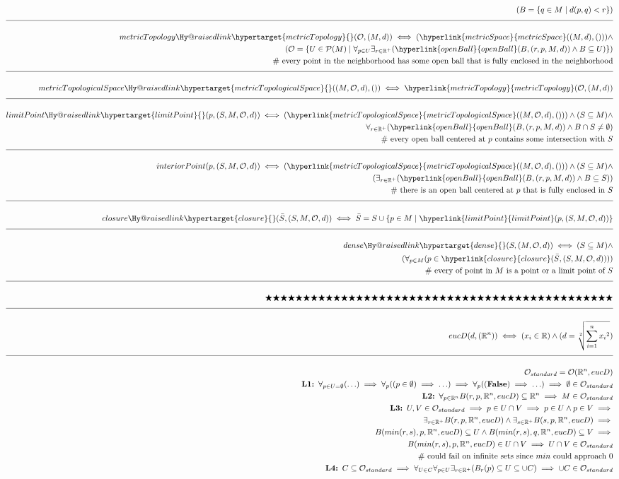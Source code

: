 \documentclass[a4paper]{article}
\makeatletter
\newcommand{\melazy}{\bigstar\bigstar\bigstar\bigstar\bigstar\bigstar\bigstar\bigstar\bigstar\bigstar\bigstar\bigstar\bigstar\bigstar\bigstar\bigstar\bigstar\bigstar\bigstar\bigstar\bigstar\bigstar\bigstar\bigstar\bigstar\bigstar\bigstar\bigstar\bigstar\bigstar\bigstar\bigstar\bigstar\bigstar\bigstar\bigstar\bigstar\bigstar\bigstar\bigstar\bigstar\bigstar\bigstar\bigstar\bigstar\bigstar}
\newcommand{\eqComment}[1]{\text{  \# #1}}
\newcommand{\n}{\\[1.5ex] \hline \nonumber \\[0ex]}
\newcommand{\m}{\nonumber \\}
\newcommand{\labeltarget}[1]{\Hy@raisedlink{\hypertarget{#1}{}}}
\newcommand{\dfn}[1]{#1\labeltarget{#1}}
\newcommand{\rfr}[1]{\hyperlink{#1}{#1}}
\makeatother
\begin{document}
\begin{tcolorbox}
\begin{align}
\m (B = \{q \in M \mid d(p, q) < r\})
\n \dfn{metricTopology}(\mathcal{O}, (M, d)) \iff (\rfr{metricSpace}((M, d), ())) \land
\m (\mathcal{O} = \{U \in \mathcal{P}(M) \mid \forall_{p \in U} \exists_{r \in \mathbb{R}^+} (\rfr{openBall}(B, (r, p, M, d)) \land B \subseteq U)\})
\m \eqComment{every point in the neighborhood has some open ball that is fully enclosed in the neighborhood}
\n \dfn{metricTopologicalSpace}((M, \mathcal{O}, d), ()) \iff \rfr{metricTopology}(\mathcal{O}, (M, d))
\n \dfn{limitPoint}(p, (S, M, \mathcal{O}, d)) \iff (\rfr{metricTopologicalSpace}((M, \mathcal{O}, d), ())) \land (S \subseteq M) \land
\m \forall_{r \in \mathbb{R}^+} (\rfr{openBall}(B, (r, p, M, d)) \land B \cap S \neq \emptyset)
\m \eqComment{every open ball centered at $p$ contains some intersection with $S$}
\n interiorPoint(p, (S, M, \mathcal{O}, d)) \iff (\rfr{metricTopologicalSpace}((M, \mathcal{O}, d), ())) \land (S \subseteq M) \land
\m (\exists_{r \in \mathbb{R}^+} (\rfr{openBall}(B, (r, p, M, d)) \land B \subseteq S))
\m \eqComment{there is an open ball centered at $p$ that is fully enclosed in $S$}
\n \dfn{closure}(\bar{S}, (S, M, \mathcal{O}, d)) \iff \bar{S} = S \cup \{p \in M \mid \rfr{limitPoint}(p, (S, M, \mathcal{O}, d))\}
\n \dfn{dense}(S, (M, \mathcal{O}, d)) \iff (S \subseteq M) \land
\m (\forall_{p \in M} (p \in \rfr{closure}(\bar{S}, (S, M, \mathcal{O}, d))))
\m \eqComment{every of point in $M$ is a point or a limit point of $S$}
\n \melazy
\n eucD(d, (\mathbb{R}^{n})) \iff (x_i \in \mathbb{R}) \land  (d = \sqrt[2]{\sum_{i=1}^n{{x_i}^2}})
\n \mathcal{O}_{standard} = \mathcal{O}(\mathbb{R}^{n}, eucD)
\m \textbf{L1: } \forall_{p \in U = \emptyset} (\ldots) \implies \forall_p ((p \in \emptyset) \implies \ldots) \implies \forall_p ((\textbf{False}) \implies \ldots) \implies \emptyset \in \mathcal{O}_{standard}
\m \textbf{L2: } \forall_{p \in \mathbb{R}^n} B(r, p, \mathbb{R}^n, eucD) \subseteq \mathbb{R}^n \implies M \in \mathcal{O}_{standard}
\m \textbf{L3: } U, V \in \mathcal{O}_{standard} \implies p \in U \cap V \implies p \in U \land p  \in V \implies 
\m \exists_{r \in \mathbb{R}^+} B(r, p, \mathbb{R}^n, eucD) \land \exists_{s \in \mathbb{R}^+} B(s, p, \mathbb{R}^n, eucD) \implies 
\m B(min(r, s), p, \mathbb{R}^n, eucD) \subseteq U \land B(min(r, s), q, \mathbb{R}^n, eucD) \subseteq V \implies
\m B(min(r, s), p, \mathbb{R}^n, eucD) \in U \cap V \implies U \cap V \in \mathcal{O}_{standard}
\m \eqComment{could fail on infinite sets since $min$ could approach $0$}
\m \textbf{L4: } C \subseteq \mathcal{O}_{standard} \implies\forall_{U \in C} \forall_{p \in U} \exists_{r \in \mathbb{R}^+} (B_r(p) \subseteq U \subseteq \cup C) \implies \cup C \in \mathcal{O}_{standard}

\end{align}
\end{tcolorbox}
\end{document}
